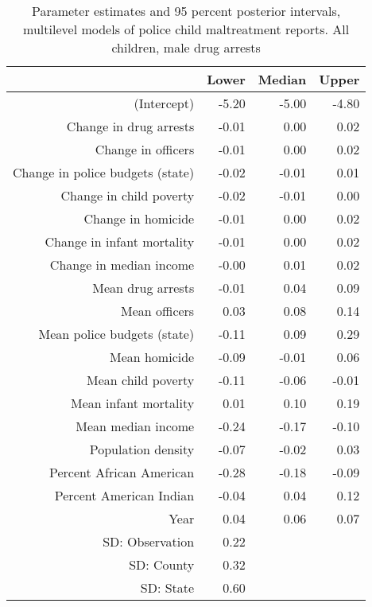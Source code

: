 \begin{table}[ht]
\centering
\begin{tabular}{rrrr}
  \hline
 & Lower & Median & Upper \\ 
  \hline
(Intercept) & -5.20 & -5.00 & -4.80 \\ 
  Change in drug arrests & -0.01 & 0.00 & 0.02 \\ 
  Change in officers & -0.01 & 0.00 & 0.02 \\ 
  Change in police budgets (state) & -0.02 & -0.01 & 0.01 \\ 
  Change in child poverty & -0.02 & -0.01 & 0.00 \\ 
  Change in homicide & -0.01 & 0.00 & 0.02 \\ 
  Change in infant mortality & -0.01 & 0.00 & 0.02 \\ 
  Change in median income & -0.00 & 0.01 & 0.02 \\ 
  Mean drug arrests & -0.01 & 0.04 & 0.09 \\ 
  Mean officers & 0.03 & 0.08 & 0.14 \\ 
  Mean police budgets (state) & -0.11 & 0.09 & 0.29 \\ 
  Mean homicide & -0.09 & -0.01 & 0.06 \\ 
  Mean child poverty & -0.11 & -0.06 & -0.01 \\ 
  Mean infant mortality & 0.01 & 0.10 & 0.19 \\ 
  Mean median income & -0.24 & -0.17 & -0.10 \\ 
  Population density & -0.07 & -0.02 & 0.03 \\ 
  Percent African American & -0.28 & -0.18 & -0.09 \\ 
  Percent American Indian & -0.04 & 0.04 & 0.12 \\ 
  Year & 0.04 & 0.06 & 0.07 \\ 
  SD: Observation & 0.22 &  &  \\ 
  SD: County & 0.32 &  &  \\ 
  SD: State & 0.60 &  &  \\ 
   \hline
\end{tabular}
\caption{Parameter estimates and 95 percent posterior intervals, multilevel models of 
             police child maltreatment reports. All children, male drug arrests} 
\end{table}
